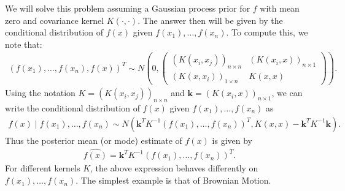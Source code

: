 \documentclass{scrartcl}
\begin{document}
We will solve this problem assuming a Gaussian process prior for $f$
with mean zero and covariance kernel $K(\cdot, \cdot)$. The answer
then will be given by the conditional distribution of $f(x)$ given 
$f(x_1), \dots, f(x_n)$. To compute this, we note that:
\begin{align*}
  (f(x_1), \dots, f(x_n), f(x))^T \sim N \left(0, \begin{pmatrix} (K(x_i, 
                                             x_j))_{n \times n} 
                                              & (K(x_i,
                                                            x))_{n
                                                            \times 1}
                                             \\ (K(x, x_i))_{1
                                             \times n} & K(x,
                                                         x) \end{pmatrix}
  \right). 
\end{align*}
Using the notation $K = (K(x_i, 
                                             x_j))_{n \times n}$ and
                                             $\mathbf{k} = (K(x_i,
                                                            x))_{n
                                                            \times
                                                            1}$, we
                                                          can write
                                                          the
                                                          conditional
                                                          distribution
                                                          of
                                                          $f(x)$
                                                          given $f(x_1),
                                                          \dots, 
f(x_n)$ as
\begin{align*}
  f(x) \mid f(x_1), \dots, f(x_n) \sim N\left(\mathbf{k}^TK^{-1} (f(x_1), \dots,
  f(x_n))^T, K(x, x) -
  \mathbf{k}^T K^{-1} \mathbf{k} \right).
\end{align*}
Thus the posterior mean (or mode) estimate of $f(x)$ is given by
\begin{align}\label{posmean}
  \widehat{f(x)} = \mathbf{k}^TK^{-1} (f(x_1), \dots, f(x_n))^T. 
\end{align}
For different kernels $K$, the above expression behaves differently on
$f(x_1), \dots, f(x_n)$. The simplest example is that of Brownian
Motion. 
\end{document}
